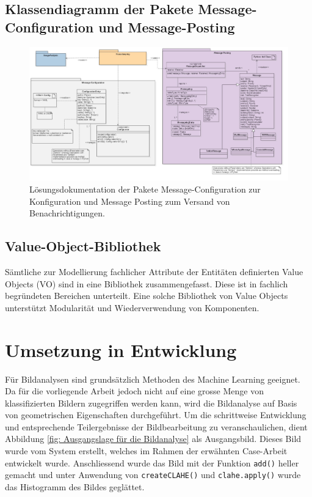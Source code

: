 \begin{landscape}
\subsection{Klassendiagramm der Pakete Message-Configuration und Message-Posting}
\begin{figure}[H]
	\center
	\includegraphics[scale=0.43]{Grafiken/modelle/solution-messaging.jpg}
	\caption{Lösungsdokumentation der Pakete Message-Configuration zur Konfiguration und Message Posting zum Versand von Benachrichtigungen.} 
	\label{fig: Lösungsdokumentation der Pakete Message-Configuration zur Konfiguration und Message Posting zum Versand von Benachrichtigungen.}
\end{figure}

\subsection{Value-Object-Bibliothek}
Sämtliche zur Modellierung fachlicher Attribute der Entitäten definierten Value Objects (VO) sind in eine Bibliothek zusammengefasst. Diese ist in fachlich begründeten Bereichen unterteilt. Eine solche Bibliothek von Value Objects unterstützt Modularität und Wiederverwendung von Komponenten. 

\end{landscape}
\restoregeometry %


\section{Umsetzung in Entwicklung}
Für Bildanalysen sind grundsätzlich Methoden des Machine Learning geeignet. Da für die vorliegende Arbeit jedoch nicht auf eine grosse Menge von klassifizierten Bildern zugegriffen werden kann, wird die Bildanalyse auf Basis von geometrischen Eigenschaften durchgeführt.
Um die schrittweise Entwicklung und entsprechende Teilergebnisse der Bildbearbeitung zu veranschaulichen, dient Abbildung \ref{fig: Ausgangslage für die Bildanalyse} als Ausgangsbild. Dieses Bild wurde vom System erstellt, welches im Rahmen der erwähnten Case-Arbeit entwickelt wurde. Anschliessend wurde das Bild mit der Funktion \texttt{add()} heller gemacht und unter Anwendung von \texttt{createCLAHE()} und \texttt{clahe.apply()} wurde das Histogramm des Bildes geglättet. 

